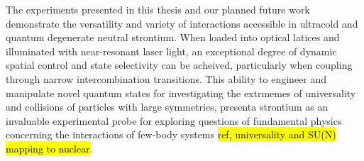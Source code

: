The experiments presented in this thesis and our planned future work demonstrate the versatility and variety of interactions accessible in ultracold and quantum degenerate neutral strontium.
When loaded into optical latices and illuminated with near-resonant laser light, an exceptional degree of dynamic spatial control and state selectivity can be acheived, particularly when coupling through narrow intercombination transitions.
This ability to engineer and manipulate novel quantum states for investigating the extrmemes of universality and collisions of particles with large symmetries, presenta strontium as an invaluable experimental probe for exploring questions of fundamental physics concerning the interactions of few-body systems \hl{ref, universality and SU(N) mapping to nuclear}.








